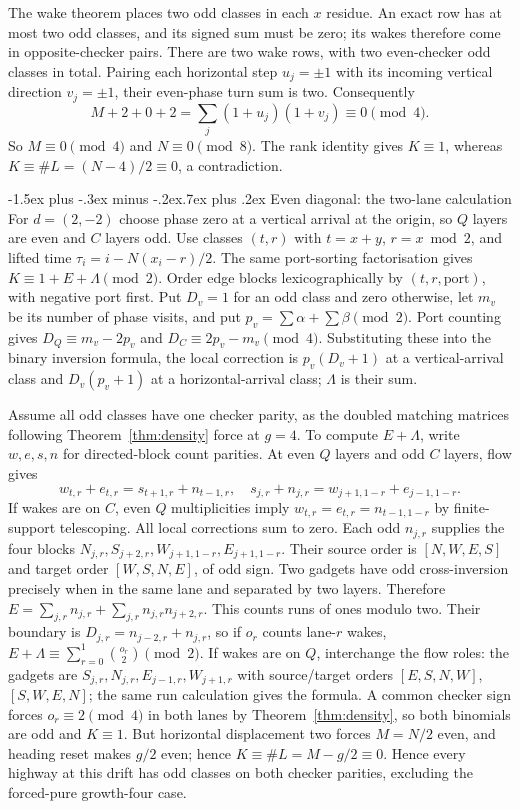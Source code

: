 \documentclass[11pt,letterpaper]{article}
\makeatletter
\renewcommand\subsection{\@startsection{subsection}{2}{\z@}%
  {-1.5ex plus -.3ex minus -.2ex}{.7ex plus .2ex}%
  {\normalfont\large\bfseries}}
\makeatother
\begin{document}
The wake theorem places two odd classes in each $x$ residue. An exact
row has at most two odd classes, and its signed sum must be zero; its
wakes therefore come in opposite-checker pairs. There are two wake rows,
with two even-checker odd classes in total. Pairing each horizontal step
$u_j=\pm1$ with its incoming vertical direction $v_j=\pm1$, their
even-phase turn sum is two. Consequently
\[
M+2+0+2=\sum_j(1+u_j)(1+v_j)\equiv0\pmod4.
\]
So $M\equiv0\pmod4$ and $N\equiv0\pmod8$.
The rank identity gives $K\equiv1$, whereas
$K\equiv\#L=(N-4)/2\equiv0$, a contradiction.

\subsection{Even diagonal: the two-lane calculation}
For $d=(2,-2)$ choose phase zero at a vertical arrival at the origin,
so $Q$ layers are even and $C$ layers odd. Use classes $(t,r)$ with $t=x+y$,
$r=x\bmod2$, and lifted time $\tau_i=i-N(x_i-r)/2$.
The same port-sorting factorisation gives
$K\equiv1+E+\Lambda\pmod2$. Order edge blocks lexicographically
by $(t,r,\text{port})$, with negative port first. Put $D_v=1$ for an odd class and zero
otherwise, let $m_v$ be its number of phase visits, and put
$p_v=\sum\alpha+\sum\beta\pmod2$. Port counting
gives $D_Q\equiv m_v-2p_v$ and $D_C\equiv2p_v-m_v\pmod4$.
Substituting these into the binary inversion formula, the local correction
is $p_v(D_v+1)$ at a vertical-arrival class and
$D_v(p_v+1)$ at a horizontal-arrival class; $\Lambda$ is their sum.

Assume all odd classes have one checker parity, as the doubled matching
matrices following Theorem~\ref{thm:density} force at $g=4$.
To compute $E+\Lambda$, write
$w,e,s,n$ for directed-block count parities. At even $Q$ layers and
odd $C$ layers, flow gives
\[
w_{t,r}+e_{t,r}=s_{t+1,r}+n_{t-1,r},\quad
s_{j,r}+n_{j,r}=w_{j+1,1-r}+e_{j-1,1-r}.
\]
If wakes are on $C$, even $Q$ multiplicities imply
$w_{t,r}=e_{t,r}=n_{t-1,1-r}$ by finite-support telescoping.
All local corrections sum to zero. Each odd $n_{j,r}$ supplies the
four blocks $N_{j,r},S_{j+2,r},W_{j+1,1-r},E_{j+1,1-r}$.
Their source order is $[N,W,E,S]$ and target order $[W,S,N,E]$,
of odd sign. Two gadgets have odd cross-inversion precisely when in the
same lane and separated by two layers. Therefore
$E=\sum_{j,r}n_{j,r}+\sum_{j,r}n_{j,r}n_{j+2,r}$.
This counts runs of ones modulo two. Their boundary is
$D_{j,r}=n_{j-2,r}+n_{j,r}$, so if $o_r$ counts lane-$r$ wakes,
$E+\Lambda\equiv\sum_{r=0}^1\binom{o_r}{2}\pmod2$.
If wakes are on $Q$, interchange the flow roles: the gadgets are
$S_{j,r},N_{j,r},E_{j-1,r},W_{j+1,r}$ with source/target orders
$[E,S,N,W]$, $[S,W,E,N]$; the same run calculation gives the formula.
A common checker sign forces $o_r\equiv2\pmod4$ in both lanes
by Theorem~\ref{thm:density}, so both binomials are odd and $K\equiv1$.
But horizontal displacement two forces $M=N/2$ even, and heading reset
makes $g/2$ even; hence $K\equiv\#L=M-g/2\equiv0$.
Hence every highway at this drift has odd classes on both checker
parities, excluding the forced-pure growth-four case.
\end{document}
